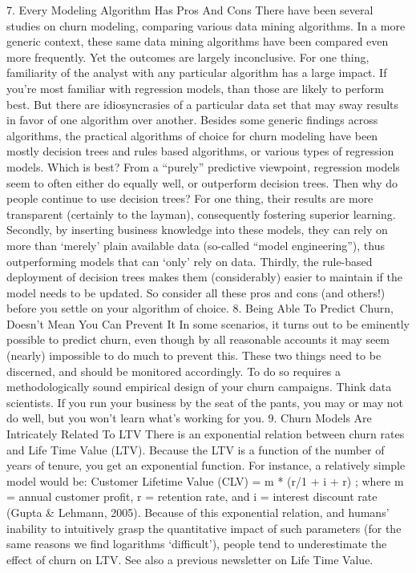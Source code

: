 7. Every Modeling Algorithm Has Pros And Cons
There have been several studies on churn modeling, comparing various data mining algorithms. In a more generic context, these same data mining algorithms have been compared even more frequently. Yet the outcomes are largely inconclusive. For one thing, familiarity of the analyst with any particular algorithm has a large impact. If you’re most familiar with regression models, than those are likely to perform best. 
But there are idiosyncrasies of a particular data set that may sway results in favor of one algorithm over another. Besides some generic findings across algorithms, the practical algorithms of choice for churn modeling have been mostly decision trees and rules based algorithms, or various types of regression models. Which is best?
From a “purely” predictive viewpoint, regression models seem to often either do equally well, or outperform decision trees. Then why do people continue to use decision trees? For one thing, their results are more transparent (certainly to the layman), consequently fostering superior learning.
Secondly, by inserting business knowledge into these models, they can rely on more than ‘merely’ plain available data (so-called “model engineering”), thus outperforming models that can ‘only’ rely on data. Thirdly, the rule-based deployment of decision trees makes them (considerably) easier to maintain if the model needs to be updated. So consider all these pros and cons (and others!) before you settle on your algorithm of choice.
8. Being Able To Predict Churn, Doesn’t Mean You Can Prevent It
In some scenarios, it turns out to be eminently possible to predict churn, even though by all reasonable accounts it may seem (nearly) impossible to do much to prevent this. These two things need to be discerned, and should be monitored accordingly. To do so requires a methodologically sound empirical design of your churn campaigns. Think data scientists. If you run your business by the seat of the pants, you may or may not do well, but you won’t learn what’s working for you.
9. Churn Models Are Intricately Related To LTV
There is an exponential relation between churn rates and Life Time Value (LTV). Because the LTV is a function of the number of years of tenure, you get an exponential function.
For instance, a relatively simple model would be: Customer Lifetime Value (CLV) = m * (r/1 + i + r) ; where m = annual customer profit, r = retention rate, and i = interest discount rate (Gupta & Lehmann, 2005).
Because of this exponential relation, and humans’ inability to intuitively grasp the quantitative impact of such parameters (for the same reasons we find logarithms ‘difficult’), people tend to underestimate the effect of churn on LTV. See also a previous newsletter on Life Time Value.

